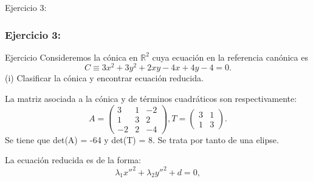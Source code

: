 \documentclass[xcolor={dvipsnames},aspectratio=169,10pt]{beamer}
\begin{document}


\begin{frame}{Ejercicio 3:}
  \frametitle{Ejercicio 3:}
  \begin{block}{Ejercicio}
    Consideremos la cónica en $\mathbb{R}^2$ cuya ecuación en la referencia canónica es
    \[C \equiv 3x^2 + 3y^2 + 2xy - 4x + 4y - 4 = 0.\]
    (i) Clasificar la cónica y encontrar ecuación reducida.
  \end{block}

  La matriz asociada a la cónica y de términos cuadráticos son respectivamente:
  \[A = \begin{pmatrix} 3 & 1 & -2 \\ 1 & 3 & 2 \\ -2 & 2 & -4 \end{pmatrix}, T = \begin{pmatrix} 3 & 1 \\ 1 & 3 \end{pmatrix}.\]
  Se tiene que det(A) = -64 y det(T) = 8. Se trata por tanto de una elipse.

  La ecuación reducida es de la forma:
  \[\lambda_1x''^2 + \lambda_2y''^2 + d = 0,\]
\end{frame}
\end{document}
